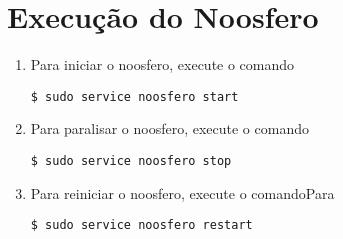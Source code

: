 \chapter{Execução do Noosfero}

\begin{enumerate}

\item Para iniciar o noosfero, execute o comando
\begin{lstlisting}
$ sudo service noosfero start
\end{lstlisting}

\item Para paralisar o noosfero, execute o comando
\begin{lstlisting}
$ sudo service noosfero stop
\end{lstlisting}

\item Para reiniciar o noosfero, execute o comandoPara
\begin{lstlisting}
$ sudo service noosfero restart
\end{lstlisting}

\end{enumerate}